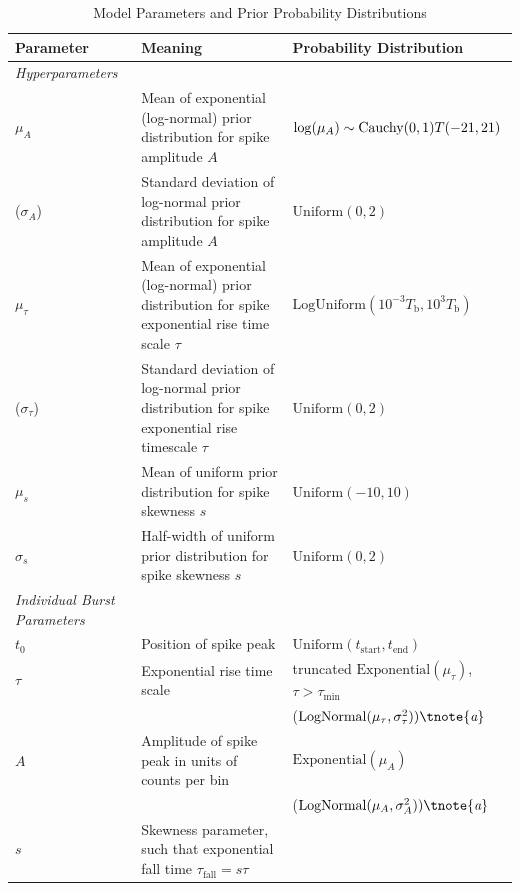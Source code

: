\documentclass[12pt]{emulateapj}
\begin{document}
\begin{table}[hbtp]
\renewcommand{\arraystretch}{1.3}
\footnotesize
\caption{Model Parameters and Prior Probability Distributions}
\begin{threeparttable} 
\begin{tabularx}{\textwidth}{p{2.0cm}p{10.0cm}X}%
\toprule
\bf{Parameter} & \bf{Meaning} & \bf{Probability Distribution} \\ \midrule
\it{Hyperparameters} && \\ \midrule
$\mu_A$ & Mean of exponential (log-normal) prior distribution for spike amplitude $A$ &  $\log(\mu_A) \sim \textnormal{Cauchy}(0, 1)T(-21, 21)$  \\
($\sigma_A$)\footnotemark[1] & Standard deviation of log-normal prior distribution for spike amplitude $A$ & $\mathrm{Uniform}(0,2)$ \\
$\mu_\tau$ & Mean of exponential (log-normal) prior distribution for spike exponential rise time scale $\tau$& $\mathrm{LogUniform}(10^{-3}T_\mathrm{b}, 10^3{T_\mathrm{b}})$\tnote{\emph{b}}  \\
($\sigma_\tau$)\footnotemark[1]  & Standard deviation of log-normal prior distribution for spike exponential rise timescale $\tau$& $\mathrm{Uniform}(0,2)$\\
$\mu_s$ & Mean of uniform prior distribution for spike skewness $s$ & $\mathrm{Uniform}(-10, 10)$ \\
$\sigma_s$ & Half-width of uniform prior distribution for spike skewness $s$& $\mathrm{Uniform}(0,2)$\\ \midrule
\it{Individual Burst Parameters} && \\ \midrule
$t_0$ & Position of spike peak & $\mathrm{Uniform}(t_{\mathrm{start}}, t_{\mathrm{end}})$ \\
$\tau$ & Exponential rise time scale & truncated $\mathrm{Exponential}(\mu_\tau)$, $\tau>\tau_{\mathrm{min}}$ \\
 && ($\mathrm{LogNormal}(\mu_\tau, \sigma^2_{\tau}))\tnote{\emph{a}} $ \\
$A$ & Amplitude of spike peak in units of counts per bin &$\mathrm{Exponential}(\mu_A)$ \\
 && ($\mathrm{LogNormal}(\mu_A, \sigma^2_{A}))\tnote{\emph{a}} $ \\ 
$s$ & Skewness parameter, such that exponential fall time $\tau_{\mathrm{fall}} = s\tau$ & \\

\end{tabularx}
\end{threeparttable}
\end{table}
\end{document}
